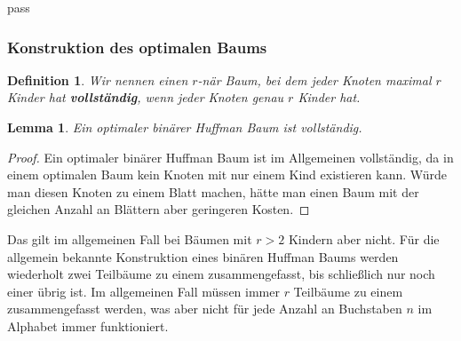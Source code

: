 pass\documentclass[a4paper,10pt,ngerman]{scrartcl}
\newtheorem{definition}[satz]{Definition}
\newtheorem{lemma}[satz]{Lemma}
\begin{document}
    \subsubsection{Konstruktion des optimalen Baums}
    \begin{definition}
        Wir nennen einen $r$-när Baum, bei dem jeder Knoten maximal $r$ Kinder hat \textbf{vollständig}, wenn jeder Knoten genau $r$ Kinder hat.
    \end{definition}
    \begin{lemma}
        Ein optimaler binärer Huffman Baum ist vollständig.
    \end{lemma}
    \begin{proof}
        Ein optimaler binärer Huffman Baum ist im Allgemeinen vollständig, da in einem optimalen Baum kein Knoten mit nur einem Kind existieren kann.
        Würde man diesen Knoten zu einem Blatt machen, hätte man einen Baum mit der gleichen Anzahl an Blättern aber geringeren Kosten.
    \end{proof}
    Das gilt im allgemeinen Fall bei Bäumen mit $r > 2$ Kindern aber nicht.
    Für die allgemein bekannte Konstruktion eines binären Huffman Baums werden wiederholt zwei Teilbäume zu einem zusammengefasst, bis schließlich nur noch einer übrig ist.
    Im allgemeinen Fall müssen immer $r$ Teilbäume zu einem zusammengefasst werden, was aber nicht für jede Anzahl an Buchstaben $n$ im Alphabet immer funktioniert.
\end{document}
